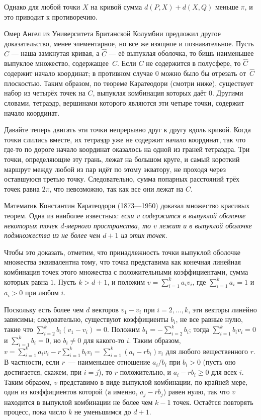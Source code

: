 Однако для любой точки $X$ на кривой сумма $d(P, X) + d(X, Q)$ меньше $\pi$, и это приводит к противоречию.

Омер Ангел из Университета Британской Колумбии
предложил другое доказательство,
менее элементарное, но все же изящное и познавательное.
Пусть $C$ --- наша замкнутая кривая, а $\hat C$ --- её выпуклая оболочка, то бишь наименьшее выпуклое множество, содержащее~$C$.
Если $C$ не содержится в полусфере, то $\hat C$ содержит начало координат;
в противном случае $0$ можно было бы отрезать от~$\hat C$ плоскостью.
Таким образом, по теореме Каратеодори (смотри ниже), существует набор из четырёх точек на $C$, выпуклая комбинация которых даёт $0$.
Другими словами, тетраэдр, вершинами которого являются эти четыре точки, содержит начало координат.

Давайте теперь двигать эти точки непрерывно друг к другу вдоль кривой.
Когда точки слились вместе, их тетраэдр уже не содержит начало координат, так что где-то по дороге начало координат оказалось на одной из граней тетраэдра.
Три точки, определяющие эту грань, лежат на большом круге, и самый короткий маршрут между любой из пар идёт по этому экватору, не проходя через оставшуюся третью точку.
Следовательно, сумма попарных расстояний трёх точек равна $2\pi$, что невозможно, так как все они лежат на $C$.

Математик Константин Каратеодори (1873---1950) доказал множество красивых теорем.
Одна из наиболее известных: \textit{если $v$ содержится в выпуклой оболочке некоторых точек $d$-мерного  пространства, то $v$ лежит и в выпуклой оболочке подмножества из не более чем $d+1$ из этих точек.}

Чтобы это доказать, отметим, что принадлежность точки выпуклой оболочке множества
эквивалентна тому, что точка представима как конечная линейная комбинация точек этого множества с положительными коэффициентами, сумма которых равна $1$.
Пусть $k>d+1$, и положим $v=\sum_{i=1}^k a_iv_i$, где $\sum_{i=1}^k a_i=1$ и $a_i>0$ при любом $i$.

Поскольку есть более чем $d$ векторов $v_1-v_i$ при $i=2,\dots,k$, эти векторы линейно зависимы;
следовательно, существуют коэффициенты $b_i$, не все равные нулю, такие что $\sum_{i=2}^k b_i(v_1-v_i)=0$.
Положим $b_1=-\sum_{i=2}^k b_i$; тогда $\sum_{i=1}^k b_i v_i=0$ и $\sum_{i=1}^k b_i=0$, но $b_i\ne 0$ для какого-то $i$.
Таким образом, $v=\sum_{i=1}^k a_iv_i-r\sum_{i=1}^k b_iv_i=\sum_{i=1}^k (a_i-rb_i)v_i$ для любого вещественного $r$.
В частности, если $r$~--- наименьшее отношение $a_i/b_i$  при $b_i>0$ (пусть оно достигается, скажем, при $i=j$), то $r$ положительно, и $a_i-rb_i\ge0$ для всех $i$.
Таким образом, $v$ представимо в виде выпуклой комбинации, по крайней мере, один из коэффициентов которой (а именно, $a_j-rb_j$) равен нулю, так что $v$ находится в выпуклой комбинации не более чем $k-1$ точек.
Остаётся повторять процесс, пока число $k$ не уменьшимся до $d+1$.

